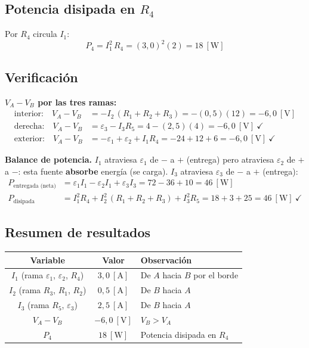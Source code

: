 \documentclass[12pt,letterpaper]{article}
\begin{document}
\subsection*{Potencia disipada en $R_4$}

Por $R_4$ circula $I_1$:
\[
    \boxed{P_4 = I_1^2\,R_4 = (3{,}0)^2(2) = 18\ [\text{W}]}
\]

\subsection*{Verificaci\'on}

\textbf{$V_A - V_B$ por las tres ramas:}
\begin{align*}
    \text{interior:}\quad V_A - V_B &= -I_2\,(R_1+R_2+R_3) = -(0{,}5)(12) = -6{,}0\ [\text{V}]\\[2pt]
    \text{derecha:}\quad  V_A - V_B &= \varepsilon_3 - I_3R_5 = 4 - (2{,}5)(4) = -6{,}0\ [\text{V}]\ \checkmark\\[2pt]
    \text{exterior:}\quad V_A - V_B &= -\varepsilon_1 + \varepsilon_2 + I_1R_4 = -24 + 12 + 6 = -6{,}0\ [\text{V}]\ \checkmark
\end{align*}

\textbf{Balance de potencia.} $I_1$ atraviesa $\varepsilon_1$ de $-$ a $+$ (entrega) pero
atraviesa $\varepsilon_2$ de $+$ a $-$: esta fuente \textbf{absorbe} energ\'ia (se carga).
$I_3$ atraviesa $\varepsilon_3$ de $-$ a $+$ (entrega):
\begin{align*}
    P_{\text{entregada (neta)}} &= \varepsilon_1 I_1 - \varepsilon_2 I_1 + \varepsilon_3 I_3
                                 = 72 - 36 + 10 = 46\ [\text{W}]\\[2pt]
    P_{\text{disipada}} &= I_1^2R_4 + I_2^2\,(R_1+R_2+R_3) + I_3^2R_5 = 18 + 3 + 25 = 46\ [\text{W}]\ \checkmark
\end{align*}

\subsection*{Resumen de resultados}

\begin{center}
\renewcommand{\arraystretch}{1.2}
\begin{tabular}{|c|c|l|}
\hline
\textbf{Variable} & \textbf{Valor} & \textbf{Observaci\'on} \\
\hline
$I_1$ (rama $\varepsilon_1$, $\varepsilon_2$, $R_4$) & $3{,}0\ [\text{A}]$ & De $A$ hacia $B$ por el borde \\
$I_2$ (rama $R_3$, $R_1$, $R_2$)                     & $0{,}5\ [\text{A}]$ & De $B$ hacia $A$ \\
$I_3$ (rama $R_5$, $\varepsilon_3$)                  & $2{,}5\ [\text{A}]$ & De $B$ hacia $A$ \\
\hline
$V_A - V_B$ & $-6{,}0\ [\text{V}]$ & $V_B > V_A$ \\
$P_4$       & $18\ [\text{W}]$     & Potencia disipada en $R_4$ \\
\hline
\end{tabular}
\end{center}
\end{document}
